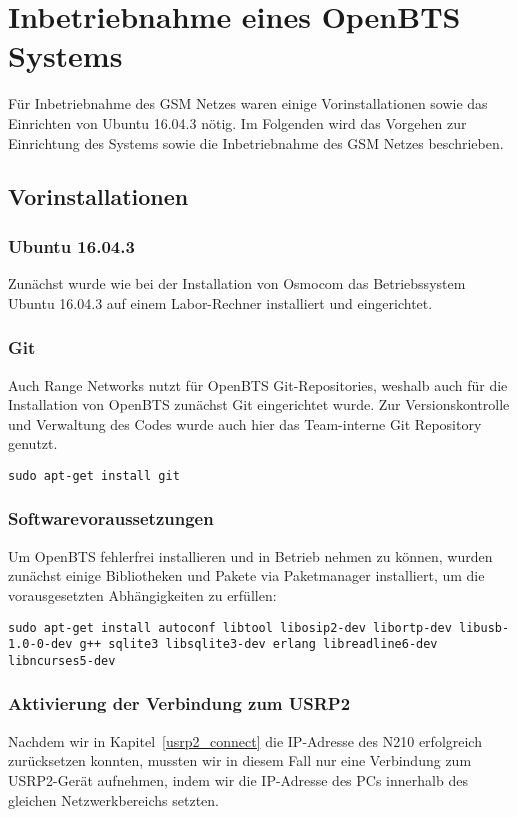 
\section{Inbetriebnahme eines OpenBTS Systems}
Für Inbetriebnahme des GSM Netzes waren einige Vorinstallationen sowie das Einrichten von Ubuntu 16.04.3 nötig. Im Folgenden wird das Vorgehen zur Einrichtung des Systems sowie die Inbetriebnahme des GSM Netzes beschrieben.

\subsection{Vorinstallationen}

\subsubsection{Ubuntu 16.04.3}
Zunächst wurde wie bei der Installation von Osmocom das Betriebssystem Ubuntu 16.04.3 auf einem Labor-Rechner installiert und eingerichtet.

\subsubsection{Git}
Auch Range Networks nutzt für OpenBTS Git-Repositories, weshalb auch für die Installation von OpenBTS zunächst Git eingerichtet wurde. Zur Versionskontrolle und Verwaltung des Codes wurde auch hier das Team-interne Git Repository genutzt.

\begin{lstlisting}
sudo apt-get install git
\end{lstlisting}

\subsubsection{Softwarevoraussetzungen}
Um OpenBTS fehlerfrei installieren und in Betrieb nehmen zu können, wurden zunächst einige Bibliotheken und Pakete via Paketmanager installiert, um die vorausgesetzten Abhängigkeiten zu erfüllen:
\begin{lstlisting}
sudo apt-get install autoconf libtool libosip2-dev libortp-dev libusb-1.0-0-dev g++ sqlite3 libsqlite3-dev erlang libreadline6-dev libncurses5-dev
\end{lstlisting}

\subsubsection{Aktivierung der Verbindung zum USRP2}
Nachdem wir in Kapitel~\ref{usrp2_connect} die IP-Adresse des N210 erfolgreich zurücksetzen konnten, mussten wir in diesem Fall nur eine Verbindung zum USRP2-Gerät aufnehmen, indem wir die IP-Adresse des PCs innerhalb des gleichen Netzwerkbereichs setzten.

